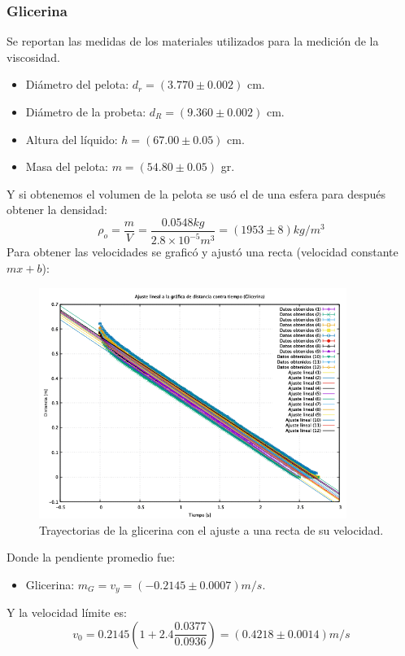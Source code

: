 \documentclass[a4paper]{article}
\begin{document}
\subsubsection*{Glicerina}
Se reportan las medidas de los materiales utilizados para la medición de la viscosidad.
\begin{itemize}
    \item Diámetro del pelota: $d_r = (3.770\pm0.002)$ cm.
    \item Diámetro de la probeta: $d_R = (9.360\pm0.002)$ cm.
    \item Altura del líquido: $h = (67.00 \pm 0.05)$ cm.
    \item Masa del pelota: $m = (54.80\pm0.05)$ gr.
\end{itemize}
Y si obtenemos el volumen de la pelota se usó el de una esfera para después obtener la densidad:
\begin{equation}
    \rho_o = \frac{m}{V} = \frac{0.0548 kg}{2.8\times10^{-5} m^3} = (1953\pm8) kg/m^3
\end{equation}
Para obtener las velocidades se graficó y ajustó una recta (velocidad constante $mx+b$):
\begin{figure}[H]
    \centering
    \includegraphics[width=10cm]{Glicerina.png}
    \caption{Trayectorias de la glicerina con el ajuste a una recta de su velocidad.}
\end{figure}
Donde la pendiente promedio fue:
\begin{itemize}
    \item Glicerina: $ m_G = v_y = (-0.2145\pm0.0007) m/s$.
\end{itemize}
Y la velocidad límite es:
\begin{equation}
    v_0 = 0.2145 \left(1+ 2.4\frac{0.0377}{0.0936} \right) = (0.4218\pm0.0014) m/s
\end{equation}
\end{document}
